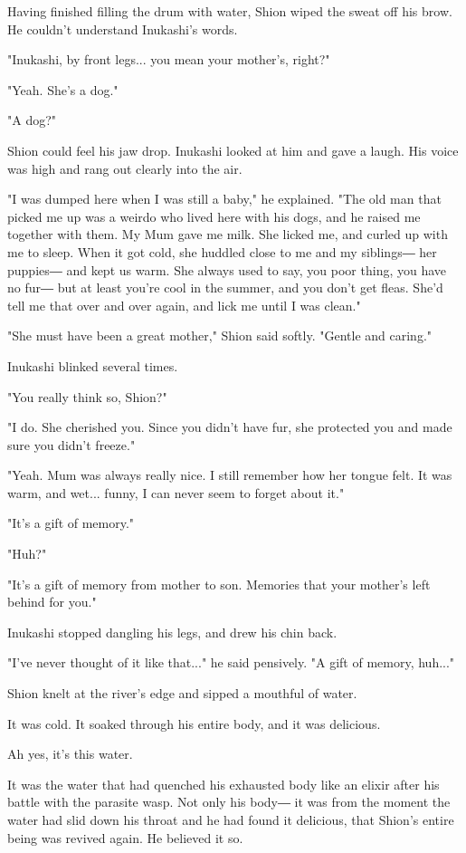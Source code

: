 Having finished filling the drum with water, Shion wiped the sweat off
his brow. He couldn't understand Inukashi's words.

"Inukashi, by front legs... you mean your mother's, right?"

"Yeah. She's a dog."

"A dog?"

Shion could feel his jaw drop. Inukashi looked at him and gave a laugh.
His voice was high and rang out clearly into the air.

"I was dumped here when I was still a baby," he explained. "The old man
that picked me up was a weirdo who lived here with his dogs, and he
raised me together with them. My Mum gave me milk. She licked me, and
curled up with me to sleep. When it got cold, she huddled close to me
and my siblings― her puppies― and kept us warm. She always used to say,
you poor thing, you have no fur― but at least you're cool in the summer,
and you don't get fleas. She'd tell me that over and over again, and
lick me until I was clean."

"She must have been a great mother," Shion said softly. "Gentle and
caring."

Inukashi blinked several times.

"You really think so, Shion?"

"I do. She cherished you. Since you didn't have fur, she protected you
and made sure you didn't freeze."

"Yeah. Mum was always really nice. I still remember how her tongue felt.
It was warm, and wet... funny, I can never seem to forget about it."

"It's a gift of memory."

"Huh?"

"It's a gift of memory from mother to son. Memories that your mother's
left behind for you."

Inukashi stopped dangling his legs, and drew his chin back.

"I've never thought of it like that..." he said pensively. "A gift of
memory, huh..."

Shion knelt at the river's edge and sipped a mouthful of water.

It was cold. It soaked through his entire body, and it was delicious.

Ah yes, it's this water.

It was the water that had quenched his exhausted body like an elixir
after his battle with the parasite wasp. Not only his body― it was from
the moment the water had slid down his throat and he had found it
delicious, that Shion's entire being was revived again. He believed it
so.

